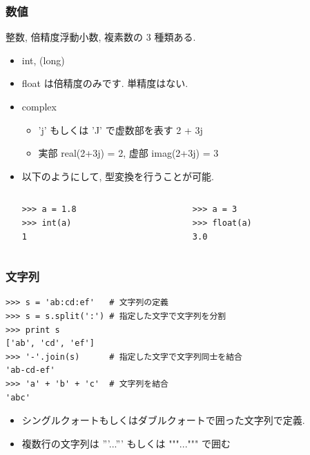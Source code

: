 \begin{frame}[t,fragile]
\frametitle{数値}

整数, 倍精度浮動小数, 複素数の 3 種類ある. 

\begin{itemize}
 \item int, (long)
 \item float は倍精度のみです. 単精度はない. 
 \item complex
       \begin{itemize}
	\item 'j' もしくは 'J' で虚数部を表す 2 + 3j
	\item 実部 real(2+3j) = 2, 虚部 imag(2+3j) = 3  
       \end{itemize}
 \item 以下のようにして, 型変換を行うことが可能. 

       \begin{columns}
	\begin{column}{4cm}
\begin{lstlisting}
>>> a = 1.8
>>> int(a)
1
\end{lstlisting}	 
	\end{column}
	\begin{column}{4cm}
\begin{lstlisting}
>>> a = 3
>>> float(a)
3.0
\end{lstlisting}	 
	\end{column}
       \end{columns}
\end{itemize}

\end{frame}

\begin{frame}[t,fragile]
\frametitle{文字列}

\begin{lstlisting}
>>> s = 'ab:cd:ef'   # 文字列の定義
>>> s = s.split(':') # 指定した文字で文字列を分割
>>> print s
['ab', 'cd', 'ef']
>>> '-'.join(s)      # 指定した文字で文字列同士を結合
'ab-cd-ef'
>>> 'a' + 'b' + 'c'  # 文字列を結合
'abc'
\end{lstlisting}

\begin{itemize}
  \item シングルクォートもしくはダブルクォートで囲った文字列で定義. 
  \item 複数行の文字列は '''...''' もしくは """...""" で囲む
\end{itemize}
\end{frame}

